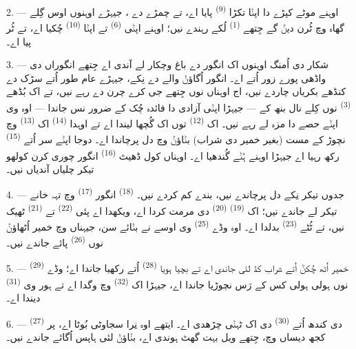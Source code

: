 2. --- اوہنے موٹے کپڑے دا اپݨا تکڑا  \textsuperscript{(9)} پایا
اے، تے چمڑے دے ، جیہڑے اوہنوں اوس گِلے گھاہ وچ ٹُرن دیݨ گے جِتھے
 \textsuperscript{(1)} لُکے رہندے نیں؛ اوہنے اپݨی 
\textsuperscript{(6)} تے اپݨا  \textsuperscript{(10)} چُکیا اے،
تے ٹُر پیا اے۔

3. --- شکار دی اُمنگ اوہنوں اک انگور دے باغ وچکار لے آندی اے جِتھے انگوراں دی
واڈھی پورے زور اُتے اے۔ انگور اُگاؤݨ والے دے نِکے، جیہڑے عام طور اُتے سڑک دے کنڈھے
بکریاں چاردے نیں، اج اوہناں نوں جِتھے جی کرے چرن دے رہے نیں، تے اک بُڈھے
 \textsuperscript{(3)} نوں کِلے نال بنھ کے — جیہڑا اپݨی آزادی دا فائدہ
چُک کے ضرور نس جاندا — اوہ وی اپݨے حصے دا مزہ لے رہے نیں۔ اک
 \textsuperscript{(12)} توں اک گُچھا لیندا اے تے اوہدا
 \textsuperscript{(14)} اک  \textsuperscript{(13)} وچ نچوڑ
کے مست (بغیر خمیر دی شراب) بݨاؤݨ وچ دل پرچاندا اے۔ دوجا اپݨے سر اُتے
 \textsuperscript{(15)} رکھ رہیا اے جیہڑا اوہنے ہُݨے گُندھیا
اے۔ اوہناں کول ڈھیٹ  \textsuperscript{(16)} انگور چوری کرن کولھو تیکر
چلیاں آندیاں نیں۔

4. --- جدوں تیکر نِکے دل پرچاندے نیں، بندے کم کردے نیں۔
 \textsuperscript{(18)} انگور 
\textsuperscript{(17)} وچ تہہ خانے تیکر لے جاندے نیں؛ اک 
\textsuperscript{(19)}  \textsuperscript{(20)} دی مرمت کردا اے،
ویکھدا اے پئی  \textsuperscript{(22)} تے 
\textsuperscript{(21)} ٹھیک نیں، تے ٹُٹے  \textsuperscript{(23)} بدلدا
اے۔ اوہ وڈے  \textsuperscript{(25)} وی اوسے نے بݨائے سن، جیہناں وچ خمیر
اُٹھاؤݨ نوں  \textsuperscript{(26)} پائے جاندے نیں۔

5. --- خمیر اُٹھ چُکݨ اُتے شراب کڈ لئی جاندی اے تے بچیا ہویا 
\textsuperscript{(28)} اُتے رکھیا جاندا اے؛ وڈے  \textsuperscript{(29)} نوں
ہولی ہولی کس کے رَس نچوڑیا جاندا اے، جیہڑا اک  \textsuperscript{(32)} وچ
وگدا اے تے ہور وی  \textsuperscript{(31)} دیندا اے۔

\VUsaut{6.0mm}
\VUsaut{3.4mm}

6. ---  \textsuperscript{(27)} دی کندھ اُتے 
\textsuperscript{(30)} دی اک ٹہݨی چڑھدی اے۔ ایتھے اوہ نِرا سجاوٹی بُوٹا اے، پر کجھ
دیساں وچ، جِتھے ویل بہت گھٹ ہوندی اے،  بݨاؤݨ لئی ہاپس اُگائے جاندے
نیں۔

